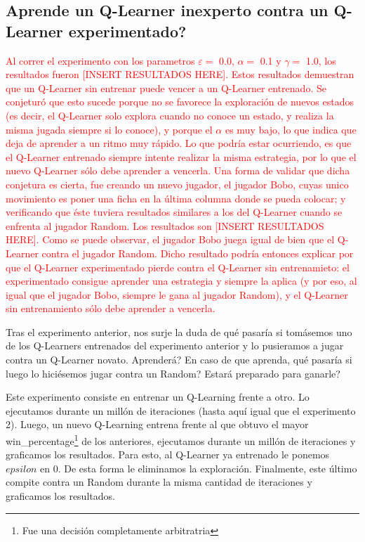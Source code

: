 \subsection{Aprende un Q-Learner inexperto contra un Q-Learner experimentado?}

\textcolor{red}{Al correr el experimento con los parametros $\varepsilon = $ 0.0, $\alpha = $ 0.1 y $\gamma = $ 1.0, los resultados fueron [INSERT RESULTADOS HERE].
Estos resultados demuestran que un Q-Learner sin entrenar puede vencer a un Q-Learner entrenado.
Se conjeturó que esto sucede porque no se favorece la exploración de nuevos estados (es decir, el Q-Learner solo explora cuando no conoce un estado, y realiza la misma jugada siempre si lo conoce), y porque el $\alpha$ es muy bajo, lo que indica que deja de aprender a un ritmo muy rápido. Lo que podría estar ocurriendo, es que el Q-Learner entrenado siempre intente realizar la misma estrategia, por lo que el nuevo Q-Learner sólo debe aprender a vencerla.
Una forma de validar que dicha conjetura es cierta, fue creando un nuevo jugador, el jugador Bobo, cuyas unico movimiento es poner una ficha en la última columna donde se pueda colocar; y verificando que éste tuviera resultados similares a los del Q-Learner cuando se enfrenta al jugador Random.
Los resultados son [INSERT RESULTADOS HERE].
Como se puede observar, el jugador Bobo juega igual de bien que el Q-Learner contra el jugador Random. Dicho resultado podría entonces explicar por que el Q-Learner experimentado pierde contra el Q-Learner sin entrenamieto: el experimentado consigue aprender una estrategia y siempre la aplica (y por eso, al igual que el jugador Bobo, siempre le gana al jugador Random), y el Q-Learner sin entrenamiento sólo debe aprender a vencerla.}

Tras el experimento anterior, nos surje la duda de qué pasaría si tomásemos uno de los Q-Learners entrenados del experimento anterior y lo pusieramos a jugar contra un Q-Learner novato. Aprenderá? En caso de que aprenda, qué pasaría si luego lo hiciésemos jugar contra un Random? Estará preparado para ganarle?

Este experimento consiste en entrenar un Q-Learning frente a otro. Lo ejecutamos durante un mill\'on de iteraciones (hasta aqu\'i igual que el experimento 2). Luego, un nuevo Q-Learning entrena frente al que obtuvo el mayor win\_percentage\footnote{Fue una decisi\'on completamente arbitratria} de los anteriores, ejecutamos durante un mill\'on de iteraciones y graficamos los resultados. Para esto, al Q-Learner ya entrenado le ponemos $epsilon$ en 0. De esta forma le eliminamos la exploración. Finalmente, este \'ultimo compite contra un Random durante la misma cantidad de iteraciones y graficamos los resultados.

